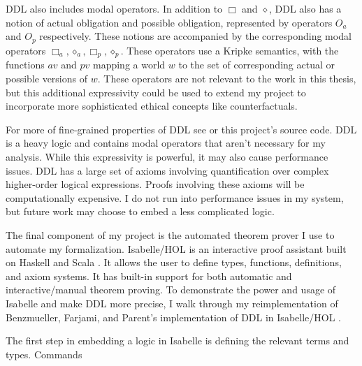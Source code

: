 \begin{isabellebody}
\begin{isamarkuptext}
DDL also includes modal operators. In addition to $\Box$ and $\diamond$, DDL also has a notion
of actual obligation and possible obligation, represented by operators $O_a$ and $O_p$ respectively. 
These notions are accompanied by the corresponding modal operators $\Box_a, \diamond_a, \Box_p, \diamond_p$. 
These operators use a Kripke semantics, with the functions $av$ and $pv$ mapping a world $w$ to the set 
of corresponding actual or possible versions of $w$. These operators are not relevant to the work in 
this thesis, but this additional expressivity could be used to extend my project to incorporate 
more sophisticated ethical concepts like counterfactuals.

For more of fine-grained properties of DDL see \citet{CJDDL} or this project's source code. DDL is a heavy logic and contains modal operators 
that aren't necessary for my analysis. While this expressivity is powerful, it may also cause performance
issues. DDL has a large set of axioms involving quantification over complex higher-order
logical expressions. Proofs involving these axioms will be computationally expensive. I do not run 
into performance issues in my system, but future work may choose to embed a less complicated logic.%
\end{isamarkuptext}\isamarkuptrue%
%
\isadelimdocument
%
\endisadelimdocument
%
\isatagdocument
%
\isamarkuptrue%
%
\endisatagdocument
{\isafolddocument}%
%
\isadelimdocument
%
\endisadelimdocument
%
\begin{isamarkuptext}%
The final component of my project is the automated theorem prover I use to automate my formalization.
Isabelle/HOL is an interactive proof assistant built on Haskell and Scala \citep{isabelle}. It 
allows the user to define types, functions, definitions, and axiom systems. It has built-in support for both
automatic and interactive/manual theorem proving. To demonstrate the power and usage of Isabelle and 
make DDL more precise, I walk through my \color{red}reimplementation
of Benzmueller, Farjami, and Parent's implementation of DDL in Isabelle/HOL \citep{BFP, logikey}\color{black}.%
\end{isamarkuptext}\isamarkuptrue%
%
\isadelimdocument
%
\endisadelimdocument
%
\isatagdocument
%
\isamarkuptrue%
%
\endisatagdocument
{\isafolddocument}%
%
\isadelimdocument
%
\endisadelimdocument
%
\begin{isamarkuptext}%
The first step in embedding a logic in Isabelle is defining the relevant terms and types. Commands

\end{isamarkuptext}
\end{isabellebody}
